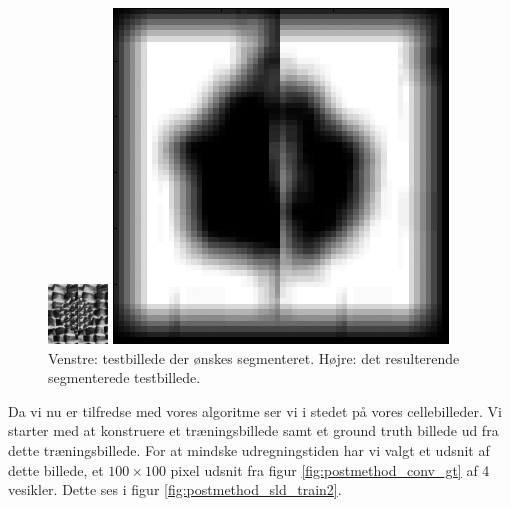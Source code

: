 
\begin{figure}[H]
	\begin{minipage}[b]{0.5\linewidth}
		\centering
		\includegraphics[scale=3]{files/postmethod/img/imTest.png}
	\end{minipage}
	\hspace{0.8cm}
	\begin{minipage}[b]{0.5\linewidth}
		\centering
		\includegraphics[scale=0.54]{files/postmethod/img/sld_res1.png}
	\end{minipage}
	\caption{Venstre: testbillede der ønskes segmenteret. Højre: det resulterende segmenterede testbillede.\label{fig:postmethod_sld_res1}}
\end{figure}

Da vi nu er tilfredse med vores algoritme ser vi i stedet på vores cellebilleder. Vi starter med at konstruere et træningsbillede samt et ground truth billede ud fra dette træningsbillede. For at mindske udregningstiden har vi valgt et udsnit af dette billede, et $100\times100$ pixel udsnit fra figur \ref{fig:postmethod_conv_gt} af 4 vesikler. Dette ses i figur \ref{fig:postmethod_sld_train2}.

